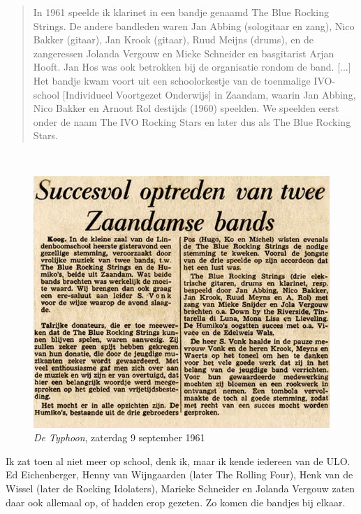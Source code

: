 \documentclass[12pt,twoside, openright]{memoir}
\begin{document}
\begin{quote}
In 1961 speelde ik klarinet in een bandje genaamd The Blue Rocking Strings. De andere bandleden waren Jan Abbing (sologitaar en zang), Nico Bakker (gitaar), Jan Krook (gitaar), Ruud Meijns (drums), en de zangeressen Jolanda Vergouw en Mieke Schneider en basgitarist Arjan Hooft. Jan Hos was ook betrokken bij de organisatie rondom de band. [...] Het bandje kwam voort uit een schoolorkestje van de toenmalige IVO-school [Individueel Voortgezet Onderwijs] in Zaandam, waarin Jan Abbing, Nico Bakker en Arnout Rol destijds (1960) speelden. We speelden eerst onder de naam The IVO Rocking Stars en later dus als The Blue Rocking Stars.
\end{quote}
 
\begin{figure}
\includegraphics[width=\textwidth]{img/ch25/bluerocking}
\caption*{\footnotesize \emph{De Typhoon}, zaterdag 9 september 1961}
\end{figure}

\noindent Ik zat toen al niet meer op school, denk ik, maar ik kende iedereen van de ULO. Ed Eichenberger, Henny van Wijngaarden (later The Rolling Four), Henk van de Wissel (later de Rocking Idolaters), Marieke Schneider en Jolanda Vergouw zaten daar ook allemaal op, of hadden erop gezeten. Zo komen die bandjes bij elkaar.
\end{document}
